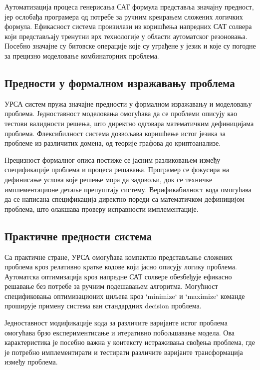 \documentclass[12pt,oneside]{memoir}
\begin{document}
Аутоматизација процеса генерисања САТ формула представља значајну предност, јер ослобађа програмера од потребе за ручним креирањем сложених логичких формула. Ефикасност система произилази из коришћења напредних САТ солвера који представљају тренутни врх технологије у области аутоматског резоновања. Посебно значајне су битовске операције које су уграђене у језик и које су погодне за прецизно моделовање комбинаторних проблема.

\subsection{Предности у формалном изражавању проблема}

УРСА систем пружа значајне предности у формалном изражавању и моделовању проблема. Једноставност моделовања омогућава да се проблеми описују као тестови валидности решења, што директно одговара математичким дефиницијама проблема. Флексибилност система дозвољава коришћење истог језика за проблеме из различитих домена, од теорије графова до криптоанализе.

Прецизност формалног описа постиже се јасним разликовањем између спецификације проблема и процеса решавања. Програмер се фокусира на дефинисање услова које решење мора да задовољи, док се техничке имплементационе детаље препуштају систему. Верификабилност кода омогућава да се написана спецификација директно пореди са математичком дефиницијом проблема, што олакшава проверу исправности имплементације.

\subsection{Практичне предности система}

Са практичне стране, УРСА омогућава компактно представљање сложених проблема кроз релативно кратке кодове који јасно описују логику проблема. Аутоматска оптимизација кроз напредне САТ солвере обезбеђује ефикасно решавање без потребе за ручним подешавањем алгоритма. Могућност спецификовања оптимизационих циљева кроз `minimize` и `maximize` команде проширује примену система ван стандардних decision проблема.

Једноставност модификације кода за различите варијанте истог проблема омогућава брзо експериментисање и итеративно побољшавање модела. Ова карактеристика је посебно важна у контексту истраживања свођења проблема, где је потребно имплементирати и тестирати различите варијанте трансформација између проблема.
\end{document}
